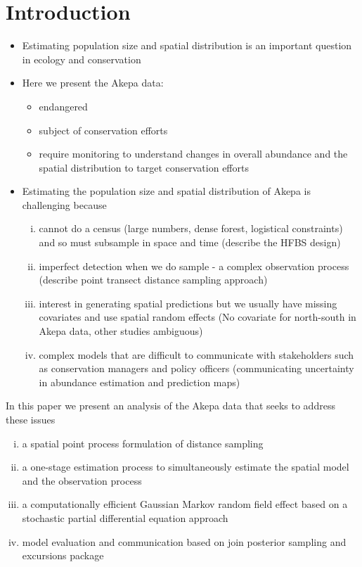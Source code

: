 \documentclass[preprint,12pt]{elsarticle}
\begin{document}
\section*{Introduction}

\begin{itemize}
	\item Estimating population size and spatial distribution is an important question in ecology and conservation
	\item Here we present the Akepa data:
		\begin{itemize}
			\item endangered
			\item subject of conservation efforts
			\item require monitoring to understand changes in overall abundance and the spatial distribution to target conservation efforts
		\end{itemize}
	\item Estimating the population size and spatial distribution of Akepa is challenging because
		\begin{enumerate}[(i)]
			\item cannot do a census (large numbers, dense forest, logistical constraints) and so must subsample in space and time (describe the HFBS design)
			\item imperfect detection when we do sample - a complex observation process (describe point transect distance sampling approach)
			\item interest in generating spatial predictions but we usually have missing covariates and use spatial random effects (No covariate for north-south in Akepa data, other studies ambiguous)
			\item complex models that are difficult to communicate with stakeholders such as conservation managers and policy officers (communicating uncertainty in abundance estimation and prediction maps)
		\end{enumerate}
\end{itemize}

In this paper we present an analysis of the Akepa data that seeks to address these issues

\begin{enumerate}[(i)]
	\item a spatial point process formulation of distance sampling
	\item a one-stage estimation process to simultaneously estimate the spatial model and the observation process
	\item a computationally efficient Gaussian Markov random field effect based on a stochastic partial differential equation approach
	\item model evaluation and communication based on join posterior sampling and excursions package
\end{enumerate}
\end{document}

